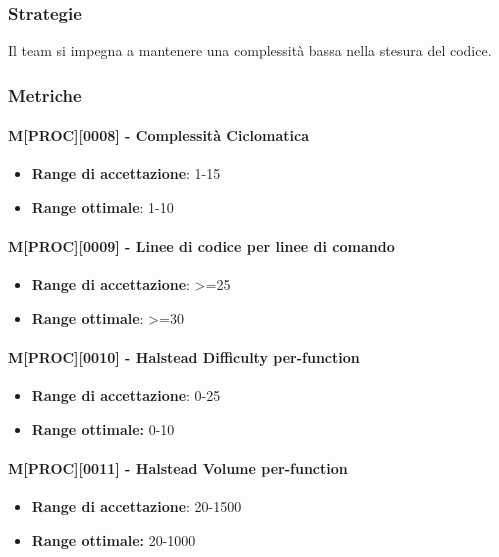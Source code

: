 \subsubsection{Strategie}
Il team si impegna a mantenere una complessità bassa nella stesura del codice.

\subsubsection{Metriche}
\paragraph{M[PROC][0008] - Complessità Ciclomatica}
\begin{itemize}
    \item \textbf{Range di accettazione}: 1-15
    \item \textbf{Range ottimale}: 1-10
\end{itemize}

\paragraph{M[PROC][0009] - Linee di codice per linee di comando} 
\begin{itemize}
    \item \textbf{Range di accettazione}: >=25
    \item \textbf{Range ottimale}: >=30
\end{itemize}

\paragraph{M[PROC][0010] - Halstead Difficulty per-function}
\begin{itemize}
    \item \textbf{Range di accettazione}: 0-25
    \item \textbf{Range ottimale:} 0-10
\end{itemize}

\paragraph{M[PROC][0011] - Halstead Volume per-function} 
\begin{itemize}
    \item \textbf{Range di accettazione}: 20-1500
    \item \textbf{Range ottimale:} 20-1000
\end{itemize}

